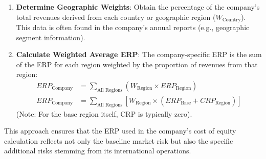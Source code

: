\begin{enumerate}
    \item \textbf{Determine Geographic Weights}: Obtain the percentage of the company's total revenues derived from each country or geographic region (\(W_{\text{Country}}\)). This data is often found in the company's annual reports (e.g., geographic segment information).
    \item \textbf{Calculate Weighted Average ERP}: The company-specific ERP is the sum of the ERP for each region weighted by the proportion of revenues from that region:
          \begin{align*}
              ERP_{\text{Company}} & = \sum_{\text{All Regions}} \left( W_{\text{Region}} \times ERP_{\text{Region}} \right)                       \\[6pt]
              ERP_{\text{Company}} & = \sum_{\text{All Regions}} \left[ W_{\text{Region}} \times (ERP_{\text{Base}} + CRP_{\text{Region}}) \right]
          \end{align*}
          (Note: For the base region itself, CRP is typically zero).
\end{enumerate}
This approach ensures that the ERP used in the company's cost of equity calculation reflects not only the baseline market risk but also the specific additional risks stemming from its international operations.

